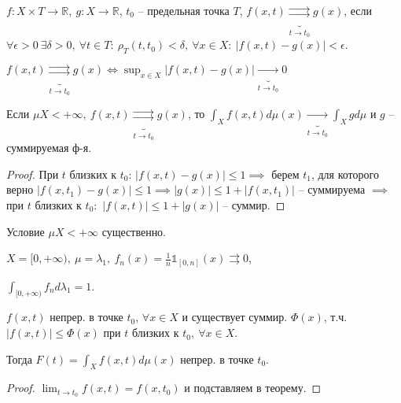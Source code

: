 \begin{definition}
    $f: X \times T \rightarrow \mathbb{R}, \ g: X \rightarrow \mathbb{R}$, $t_0$ -- предельная точка $T$, $f(x, t) \underbrace{\rightrightarrows}_{t \rightarrow t_0} g(x)$, если $\forall \epsilon > 0 \ \exists \delta > 0, \ \forall t \in T: \ \rho_T (t, t_0) < \delta, \ \forall x \in X: \ | f(x, t) - g(x) | < \epsilon$.
\end{definition}

\begin{remark}
    $f(x, t) \underbrace{\rightrightarrows}_{t \rightarrow t_0} g(x) \Leftrightarrow \sup_{x \in X} { | f(x, t) - g(x) | } \underbrace{\rightarrow}_{t \rightarrow t_0} 0$
\end{remark}

\begin{consequence}
    Если $\mu X < +\infty, \ f(x, t) \underbrace{\rightrightarrows}_{t \rightarrow t_0} g(x)$, то $\int_X { f(x, t) d \mu(x) } \underbrace{\rightarrow}_{t \rightarrow t_0} \int_X { g d \mu }$ и $g$ -- суммируемая ф-я.
\end{consequence}

\begin{proof}
    При $t$ близких к $t_0$: $|f(x, t) - g(x)| \leq 1 \implies$ берем $t_1$, для которого верно $|f(x, t_1) - g(x)| \leq 1 \implies |g(x)| \leq 1 + |f(x, t_1)|$ -- суммируема $\implies$ при $t$ близких к $t_0: $ $|f(x, t)| \leq 1 + |g(x)|$ -- суммир.
\end{proof}

\begin{remark}
    Условие $\mu X < +\infty$ существенно.

    $X = [0, +\infty), \ \mu = \lambda_1, \ f_n(x) = \frac{1}{n} \mathds{1}_{[0, n]} (x) \rightrightarrows 0$,

    $\int_{[0, +\infty)} {f_n d \lambda_1} = 1$.
\end{remark}

\begin{consequence}
    $f(x, t)$ непрер. в точке $t_0$, $\forall x \in X$ и существует суммир. $\Phi(x)$, т.ч. $| f(x, t) | \leq \Phi(x)$ при $t$ близких к $t_0, \ \forall x \in X$. 

    Тогда $F(t) = \int_X{ f(x, t) d \mu (x) }$ непрер. в точке $t_0$.
\end{consequence}
\begin{proof}
    $\lim_{t \rightarrow t_0} { f(x, t) } = f(x, t_0)$ и подставляем в теорему.
\end{proof}

